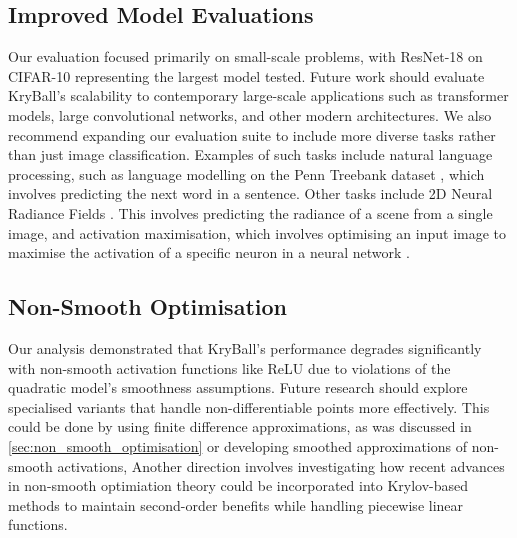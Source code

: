 \subsection{Improved Model Evaluations}
\label{ssec:improved_model_evaluations}

Our evaluation focused primarily on small-scale problems, with ResNet-18 on CIFAR-10 representing the largest model tested. Future work should evaluate KryBall's scalability to contemporary large-scale applications such as transformer models, large convolutional networks, and other modern architectures. We also recommend expanding our evaluation suite to include more diverse tasks rather than just image classification. Examples of such tasks include natural language processing, such as language modelling on the Penn Treebank dataset \citep{penntreebank}, which involves predicting the next word in a sentence. Other tasks include 2D Neural Radiance Fields \citep{mildenhall2021nerf}. This involves predicting the radiance of a scene from a single image, and activation maximisation, which involves optimising an input image to maximise the activation of a specific neuron in a neural network \citep{activation_maximisation}.

\subsection{Non-Smooth Optimisation}
\label{ssec:non_smooth_optimisation_last}

Our analysis demonstrated that KryBall's performance degrades significantly with non-smooth activation functions like ReLU due to violations of the quadratic model's smoothness assumptions. Future research should explore specialised variants that handle non-differentiable points more effectively. This could be done by using finite difference approximations, as was discussed in \cref{sec:non_smooth_optimisation} or developing smoothed approximations of non-smooth activations, Another direction involves investigating how recent advances in non-smooth optimiation theory could be incorporated into Krylov-based methods to maintain second-order benefits while handling piecewise linear functions.

